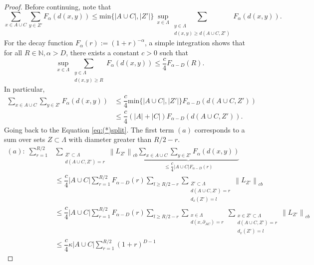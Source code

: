 \documentclass[10pt,a4paper]{amsart}
\newcommand{\La}{\Lambda}
\newcommand{\abs}[1]{\left \vert#1\right\vert}
\newcommand{\normm}[2]{\left\lVert#1\right\rVert_{#2}}
\begin{document}
\begin{proof}
     
     Before continuing, note that
     \begin{equation}
         \sum_{x\in A\cup C}\sum_{y\in Z'}F_\alpha(d(x,y))\leq \text{min}\{\abs{A\cup C},\abs{Z'}\}\,\sup_{x\in \Lambda}\sum\limits_{\substack{y\in \Lambda \\ 
         d(x,y)\geq d(A\cup C,Z')
         }}   
         F_\alpha\left (d(x,y)\right).
     \end{equation}
    For the decay function $F_\alpha (r):=(1+r)^{-\alpha}$, a simple integration shows that for all $R\in \mathbb{N},\alpha > D$, there exists a constant $c > 0$ such that
    \begin{equation}
        \sup_{x\in \Lambda}\sum\limits_{\substack{y\in \Lambda \\ 
         d(x,y)\geq R
         }}   
         F_\alpha\left (d(x,y)\right)\leq \dfrac{c}{4}F_{\alpha-D}(R).
    \end{equation}
    In particular,
    \begin{align}
        \sum_{x\in A\cup C}\sum_{y\in Z'}F_\alpha(d(x,y))& \leq \dfrac{c}{4}\text{min}\{\abs{A\cup C},\abs{Z'}\}F_{\alpha-D}(d(A\cup C,Z')) \\ & \nonumber \leq\dfrac{c}{4}(\abs{A}+\abs{C})F_{\alpha-D}(d(A\cup C,Z')).
    \end{align}
    Going back to the Equation \eqref{eq:(*)split}. The first term $(a)$ corresponds to a sum over sets $Z\subset \La$ with diameter greater than $R/2-r$.
\begin{align}
(a):\;\sum_{r=1}^{R/2}&
\sum_{\substack{Z'\subset \La \\ d(A\cup C,Z')= r}}
\normm{L_{Z'}}{cb}
\underbrace{\sum_{x\in A\cup C}\sum_{y\in Z'}F_\alpha(d(x,y))}_{\le \dfrac{c}{4}\abs{A\cup C}F_{\alpha-D}(r)}
\\
&\le
\dfrac{c}{4}\abs{A\cup C}
\sum_{r=1}^{R/2}
F_{\alpha-D}(r)
\sum_{l\ge R/2-r}
\sum_{\substack{Z'\subset \La \\ d(A\cup C,Z')= r \\ d_x(Z')=l}}
\normm{L_{Z'}}{cb}
\nonumber\\
&\le
\dfrac{c}{4}\abs{A\cup C}
\sum_{r=1}^{R/2}
F_{\alpha-D}(r)
\sum_{l\ge R/2-r}
\sum_{\substack{x\in \La \\ d(x,\partial_{AC})= r}}
\sum_{\substack{x\in Z'\subset \La \\ d(A\cup C,Z')= r \\ d_x(Z')=l}}
\normm{L_{Z'}}{cb}
\nonumber\\
&\le
\dfrac{c}{4}\kappa \abs{A\cup C}
\sum_{r=1}^{R/2}
(1+r)^{D-1}

\end{align}
\end{proof}
\end{document}
